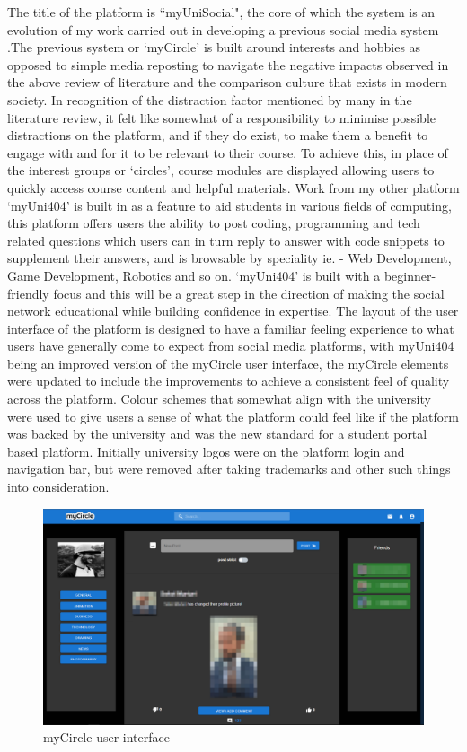 \documentclass[lettersize,journal]{IEEEtran}
\begin{document}
        The title of the platform is ``myUniSocial", the core of which the system is an evolution of my work carried out in developing a previous
        social media system \cite{Daley 2022}.The previous system or `myCircle'\cite{myCircle} is built around interests and hobbies as opposed
        to simple media reposting to navigate the negative impacts observed in the above review of literature and the comparison culture that exists in modern
        society. In recognition of the distraction factor mentioned by many in the literature review, it felt like somewhat of a responsibility
        to minimise possible distractions on the platform, and if they do exist, to make them a benefit to engage with and for it to be relevant
        to their course. To achieve this, in place of the interest groups or `circles', course modules are displayed allowing users to
        quickly access course content and helpful materials. Work from my other  platform `myUni404' \cite{myUni404} is built in as a feature to aid students
        in various fields of computing, this platform offers users the ability to post coding, programming and tech related questions which users can in turn reply to answer with code snippets to
	supplement their answers, and is browsable by speciality ie. -  Web Development, Game Development, Robotics and so on. `myUni404' is built with a beginner-friendly focus and this will be
	a great step in the direction of making the social network educational while building confidence in expertise.
	The layout of the user interface of the platform is designed to have a familiar feeling experience to what users have generally come to expect from social media platforms, with myUni404 being an 
	improved version of the myCircle user interface, the myCircle elements were updated to include the improvements to achieve a consistent feel of quality across the platform. 
	Colour schemes that somewhat align with the university were used to give users a sense of what the platform could feel like if the platform was backed by the university and was the new
	standard for a student portal based platform. Initially university logos were on the platform login and navigation bar, but were removed after taking trademarks and other such things into
	consideration.

        \begin{figure}[h!]
                \includegraphics[width=\linewidth]{myCircle.PNG}
                \caption{myCircle user interface}
                \label{figure 1}
        \end{figure}
	
\end{document}
